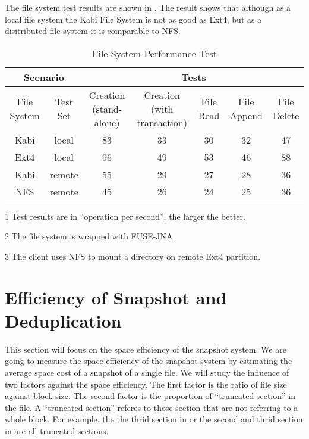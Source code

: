     The file system test results are shown in . The result shows that although as a local file system the Kabi File System is not as good as Ext4, but as a disitributed file system it is comparable to NFS.

\begin{lscape} 
\begin{table}[t]
\caption{File System Performance Test}
\label{tab:fs_performance}
\begin{center}
\begin{threeparttable}
\begin{tabular}{|c|c|c|c|c|c|c|}
\hline
\multicolumn{2}{|c|}{Scenario} & \multicolumn{5}{c|}{Tests\tnote{1}} \\
\hline
File System & Test Set & Creation (stand-alone) & Creation (with transaction) & File Read & File Append & File Delete\\
\hline
Kabi & local & 83 & 33 & 30 & 32 & 47 \\
\hline
Ext4\tnote{2}& local & 96 & 49 & 53 & 46 & 88 \\
\hline
Kabi & remote & 55 & 29 & 27 & 28 & 36 \\
\hline
NFS \tnote{2,3} & remote & 45 & 26 & 24 & 25 & 36 \\
\hline
\end{tabular}
\begin{tablenotes}
\item[1] Test results are in ``operation per second'', the larger the better.
\item[2] The file system is wrapped with FUSE-JNA.
\item[3] The client uses NFS to mount a directory on remote Ext4 partition.
\end{tablenotes}
\end{threeparttable}
\end{center}
\end{table}
\end{lscape} 

\section {Efficiency of Snapshot and Deduplication}

    This section will focus on the space efficiency of the snapshot system. We are going to measure the space efficiency of the snapshot system by estimating the average space cost of a snapshot of a single file. We will study the influence of two factors against the space efficiency. The first factor is the ratio of file size against block size. The second factor is the proportion of ``truncated section'' in the file. A ``truncated section'' referes to those section that are not referring to a whole block. For example, the the thrid section in  or the second and thrid section in  are all truncated sections.

